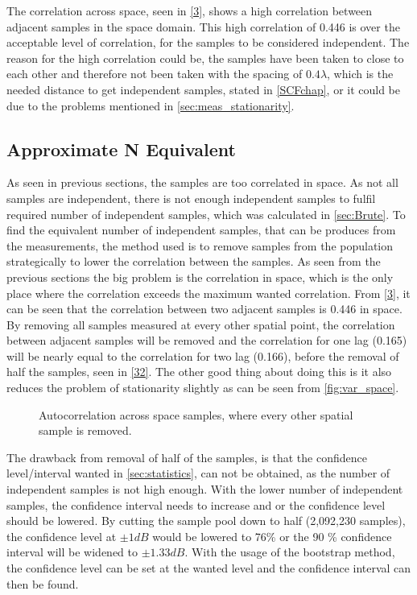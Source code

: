 The correlation across space, seen in \autoref{3}, shows a high correlation between adjacent samples in the space domain. This high correlation of 0.446 is over the acceptable level of correlation, for the samples to be considered independent. The reason for the high correlation could be, the samples have been taken to close to each other and therefore not been taken with the spacing of $0.4 \lambda$, which is the needed distance to get independent samples, stated in \autoref{SCFchap}, or it could be due to the problems mentioned in \autoref{sec:meas_stationarity}.


\subsection{Approximate N Equivalent}\label{approxN}


As seen in previous sections, the samples are too correlated in space. As not all samples are independent, there is not enough independent samples to fulfil required number of independent samples, which was calculated in \autoref{sec:Brute}. To find the equivalent number of independent samples, that can be produces from the measurements, the method used is to remove samples from the population strategically to lower the correlation between the samples. As seen from the previous sections the big problem is the correlation in space, which is the only place where the correlation exceeds the maximum wanted correlation. From \autoref{3}, it can be seen that the correlation between two adjacent samples is 0.446 in space. By removing all samples measured at every other spatial point, the correlation between adjacent samples will be removed and the correlation for one lag (0.165) will be nearly equal to the correlation for two lag (0.166), before the removal of half the samples, seen in \autoref{32}. The other good thing about doing this is it also reduces the problem of stationarity slightly as can be seen from \autoref{fig:var_space}.


\begin{figure}[H]
\begin{center}

\caption{Autocorrelation across space samples, where every other spatial sample is removed.}
\label{32}
\end{center}
\end{figure}

The drawback from removal of half of the samples, is that the confidence level/interval wanted in \autoref{sec:statistics}, can not be obtained, as the number of independent samples is not high enough. With the lower number of independent samples, the confidence interval needs to increase and or the confidence level should be lowered. By cutting the sample pool down to half (2,092,230 samples), the confidence level at $\pm 1dB$ would be lowered to 76\% or the 90 \% confidence interval will be widened to $\pm 1.33dB$. With the usage of the bootstrap method, the confidence level can be set at the wanted level and the confidence interval can then be found.




